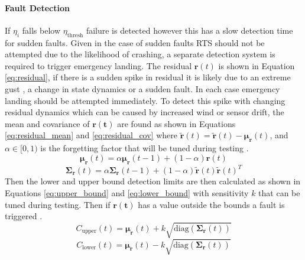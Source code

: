 \paragraph{Fault Detection}
If $\eta_i$ falls below $\eta_{\text{thresh}}$ failure is detected however this has a slow detection time for sudden faults. Given in the case of sudden faults \gls{RTS} should not be attempted due to the likelihood of crashing, a separate detection system is required to trigger emergency landing. The residual $\mathbf{r}(t)$ is shown in Equation \ref{eq:residual}, if there is a sudden spike in residual it is likely due to an extreme gust , a change in state dynamics or a sudden fault. In each case emergency landing should be attempted immediately. To detect this spike with changing residual dynamics which can be caused by increased wind or sensor drift, the mean and covariance of $\mathbf{r(t)}$ are found as shown in Equations \ref{eq:residual_mean} and \ref{eq:residual_cov} where  $\mathbf{\tilde{r}}(t) = \boldsymbol{\tilde{r}}(t) - \boldsymbol{\mu_r}(t)$, and $\alpha \in [0,1)$ is the forgetting factor that will be tuned during testing \cite{roberts1959}.
\begin{equation}\label{eq:residual_mean}
     \boldsymbol{\mu_r}(t) = \alpha \boldsymbol{\mu_r}(t-1) + (1 - \alpha) \mathbf{r}(t)
\end{equation}
\begin{equation}\label{eq:residual_cov}
    \boldsymbol{\Sigma_r}(t) = \alpha \boldsymbol{\Sigma_r}(t-1) + (1 - \alpha) \boldsymbol{\tilde{r}}(t)\boldsymbol{\tilde{r}}(t)^T
\end{equation}
Then the lower and upper bound detection limits are then calculated as shown in Equations \ref{eq:upper_bound} and \ref{eq:lower_bound} with sensitivity $k$ that can be tuned during testing. Then if $\mathbf{r(t)}$ has a value outside the bounds a fault is triggered \cite{Perry2010}.
\begin{equation}\label{eq:upper_bound}
    C_{\text{upper}}(t) = \boldsymbol{\mu_r}(t) + k \sqrt{\text{diag}(\boldsymbol{\Sigma_r}(t))} 
\end{equation}
\begin{equation}\label{eq:lower_bound}
    C_{\text{lower}}(t) =  \boldsymbol{\mu_r}(t) - k \sqrt{\text{diag}(\boldsymbol{\Sigma_r}(t))}
\end{equation}

